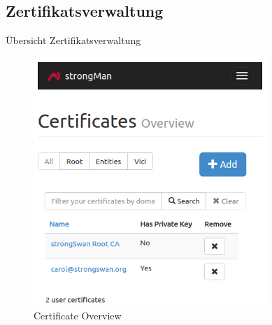 \subsection{Zertifikatsverwaltung}
\noindent\begin{minipage}[t]{0.4\textwidth}
\vspace{0pt}
Übersicht Zertifikatsverwaltung
\end{minipage}
\hfill
\begin{minipage}[t]{0.6\textwidth}
\vspace{0pt}
    \begin{figure}[H]
    	\centering
    	\includegraphics[width=250pt]{images/certificate_overview.png}
    	\caption{Certificate Overview}
    \end{figure}
\end{minipage}